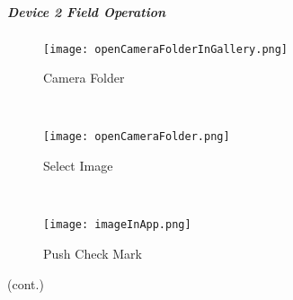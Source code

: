 \vspace{.5in}

\vspace{3in}

\vspace{3in}

\clearpage
\subparagraph*{Device 2 Field Operation}
\begin{wrapfigure}{r}{0.4\textwidth}
\centering
    \texttt{[image: openCameraFolderInGallery.png]}
\vspace{-.1in}

\caption {Camera Folder}
\vspace{.05in}

\HRule \\[.4cm] %
\vspace{.05in}

    \texttt{[image: openCameraFolder.png]}
\vspace{-.1in}

\caption{Select Image}
\vspace{.1in}

\HRule \\[.4cm] %
\vspace{.05in}

    \texttt{[image: imageInApp.png]}
\vspace{-.1in}

\caption{Push Check Mark}
\end{wrapfigure}

{\footnotesize (cont.)}
\vspace{1in}

\vspace{2.5in}

\vspace{2.25in}

\clearpage


